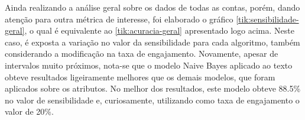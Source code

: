 \documentclass[oneside,openright,12pt]{ufsm_2015} %
\begin{document}
    \par Ainda realizando a análise geral sobre os dados de todas as contas, porém, dando atenção para outra métrica de interesse, foi elaborado o gráfico \ref{tik:sensibilidade-geral}, o qual é equivalente ao \ref{tik:acuracia-geral} apresentado logo acima. Neste caso, é exposta a variação no valor da sensibilidade para cada algoritmo, também considerando a modificação na taxa de engajamento. Novamente, apesar de intervalos muito próximos, nota-se que o modelo Naive Bayes aplicado ao texto obteve resultados ligeiramente melhores que os demais modelos, que foram aplicados sobre os atributos. No melhor dos resultados, este modelo obteve 88.5\% no valor de sensibilidade e, curiosamente, utilizando como taxa de engajamento o valor de 20\%.
    
    \mydata
    
\end{document}

